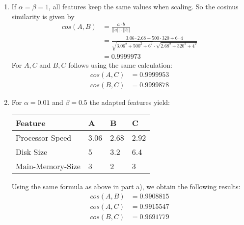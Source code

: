 \begin{enumerate}[label=(\alph*)]
    \item If $\alpha = \beta = 1$, all features keep the same values when scaling. So the cosinus similarity is given by
    \begin{align*}
        cos(A,B) &= \frac{a \cdot b}{||a|| \cdot ||b||} \\
                &=  \frac{3.06 \cdot 2.68 + 500 \cdot 320 + 6 \cdot 4}{\sqrt{3.06^2 + 500^2 + 6^2} \cdot \sqrt{2.68^2 + 320^2 + 4^2}} \\
                &= 0.9999973
    \end{align*}
    For $A, C$ and $B, C$ follows using the same calculation:
    \begin{align*}
        cos(A,C) &= 0.9999953 \\
        cos(B,C) &= 0.9999878
    \end{align*}
    \item For $\alpha = 0.01$ and $\beta = 0.5$ the adapted features yield: 
    \begin{table}[!htb]
        \centering
        \begin{tabular}{llll}
        \hline
        \textbf{Feature} & \textbf{A} & \textbf{B} & \textbf{C} \\ \hline
        Processor Speed  & 3.06       & 2.68       & 2.92       \\
        Disk Size        & 5       & 3.2        & 6.4        \\
        Main-Memory-Size & 3          & 2          & 3          \\ \hline
        \end{tabular}
    \end{table}
    
    Using the same formula as above in part a), we obtain the following results: 
    \begin{align*}
        cos(A,B) &= 0.9908815 \\
        cos(A,C) &= 0.9915547 \\
        cos(B,C) &= 0.9691779
    \end{align*}


\end{enumerate}
